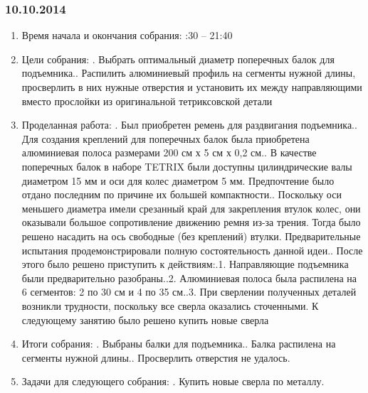 \documentclass[12pt]{article}
\begin{document}
	      \subsubsection{10.10.2014}
	      \begin{enumerate}
	      	\item Время начала и окончания собрания:
	      	:30 – 21:40
	      	\item Цели собрания:
	      	.	Выбрать оптимальный диаметр поперечных балок для подъемника..	Распилить алюминиевый профиль на сегменты нужной длины, просверлить в них нужные отверстия и установить их между направляющими вместо прослойки из оригинальной тетриксовской детали
	      	\newline
	      	\item Проделанная работа:
	      	.	Был приобретен ремень для раздвигания подъемника..	Для создания креплений для поперечных балок была приобретена алюминиевая полоса размерами 200 см х 5 см х 0,2 см..	В качестве поперечных балок в наборе TETRIX были доступны цилиндрические валы диаметром 15 мм и оси для колес диаметром 5 мм. Предпочтение было отдано последним по причине их большей компактности..	Поскольку оси меньшего диаметра имели срезанный край для закрепления втулок колес, они оказывали большое сопротивление движению ремня из-за трения. Тогда было решено насадить на ось свободные (без креплений) втулки. Предварительные испытания продемонстрировали полную состоятельность данной идеи..	После этого было решено приступить к действиям:.1.	Направляющие подъемника были предварительно разобраны..2.	Алюминиевая полоса была распилена на 6 сегментов: 2 по 30 см и 4 по 35 см..3.	При сверлении полученных деталей возникли трудности, поскольку все сверла оказались сточенными. К следующему занятию было решено купить новые сверла
	      	\newline
	      	\item Итоги собрания:
	      	.	Выбраны балки для подъемника..	Балка распилена на сегменты нужной длины..	Просверлить отверстия не удалось.
	      	\newline
	      	\item Задачи для следующего собрания:
	      	.	Купить новые сверла по металлу.
	      \end{enumerate}
	      \newpage
\end{document}
